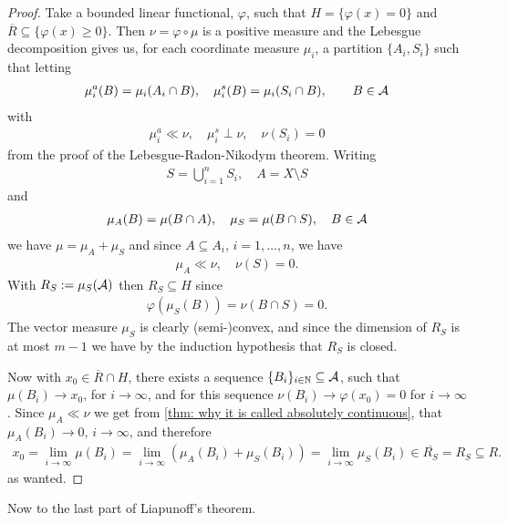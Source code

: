 \documentclass[../../main.tex]{subfiles}
\begin{document}
\begin{proof}
Take a bounded linear functional, $\varphi$, such that $H=\{\varphi(x)=0\}$ and $\overline{R}\subseteq \{ \varphi(x) \ge 0\}$. Then $\nu=\varphi\circ \mu$ is a positive measure %
and the Lebesgue decomposition gives us, for each coordinate measure $\mu_{i}$, a partition $\{A_{i}, S_{i}\}$ such that letting
\begin{align*}
	\mu_{i}^{a}(B)=\mu_{i}(A_{i}\cap B), \quad \mu_{i}^{s}(B)=\mu_{i}(S_{i}\cap B), \qquad B\in \mathcal{A}
\end{align*}
with
\begin{align*}
	\mu_{i}^{a} \ll \nu, \quad \mu_{i}^{s} \perp \nu, \quad \nu(S_{i})=0
\end{align*}
from the proof of the Lebesgue-Radon-Nikodym theorem.
Writing
\begin{align*}
	S=\bigcup_{i=1}^{n}S_{i}, \quad A=X\setminus S
\end{align*}
and
\begin{align*}
	\mu_{A}(B)=\mu(B\cap A), \quad \mu_{S}=\mu(B\cap S), \quad B\in \mathcal{A}
\end{align*}
we have $\mu=\mu_{A}+\mu_{S}$ and since $A\subseteq A_{i}$, $i=1,\dots, n$, we have
\begin{align*}
	\mu_{A} \ll \nu, \quad \nu(S)=0.
\end{align*}
With $R_{S}:=\mu_{S}(\mathcal{A})$ then $R_{S}\subseteq H$ since
\begin{align*}
	\varphi(\mu_{S}(B)) = \nu(B\cap S) = 0.
\end{align*}
The vector measure $\mu_{S}$ is clearly (semi-)convex, and since the dimension of $R_{S}$ is at most $m-1$ we have by the induction hypothesis that $R_{S}$ is closed.

Now with $x_{0}\in \overline{R}\cap H$, there exists a sequence $\{B_{i}\}_{i\in \mathbb{N}}\subseteq \mathcal{A}$, such that $\mu(B_{i})\to x_{0}$, for $i\to \infty$, and for this sequence $\nu(B_{i})\to \varphi(x_{0})=0$ for $i\to \infty$. Since $\mu_{A} \ll \nu$ we get from \cref{thm: why it is called absolutely continuous},
that $\mu_{A}(B_{i})\to 0$, $i\to \infty$, and therefore
\begin{align*}
	x_{0}=\lim_{i\to \infty} \mu(B_{i})=\lim_{i\to \infty} (\mu_{A}(B_{i}) + \mu_{S}(B_{i})) = \lim_{i\to \infty} \mu_{S}(B_{i}) \in \overline{R_{S}}=R_{S}\subseteq R.
\end{align*}
as wanted.
\end{proof}


Now to the last part of Liapunoff's theorem.
\end{document}
